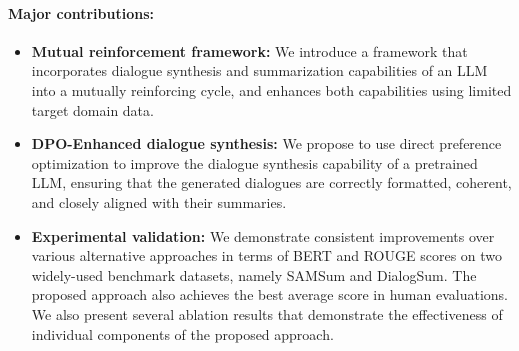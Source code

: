 

\paragraph{Major contributions:}
\begin{itemize}
  \item \textbf{Mutual reinforcement framework:} We introduce a framework that incorporates dialogue synthesis and summarization capabilities of an LLM into a mutually reinforcing cycle, and enhances both capabilities using limited target domain data.
  \item \textbf{DPO-Enhanced dialogue synthesis:} We propose to use direct preference optimization to improve the dialogue synthesis capability of a pretrained LLM, ensuring that the generated dialogues are correctly formatted, coherent, and closely aligned with their summaries.
  \item \textbf{Experimental validation:} We demonstrate consistent improvements over various alternative approaches in terms of BERT and ROUGE scores on two widely-used benchmark datasets, namely SAMSum and DialogSum. The proposed approach also achieves the best average score in human evaluations. We also present several ablation results that demonstrate the effectiveness of individual components of the proposed approach.
\end{itemize}


